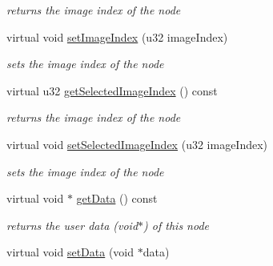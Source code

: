 \begin{DoxyCompactItemize}
\begin{DoxyCompactList}\small\item\em returns the image index of the node \end{DoxyCompactList}\item 
\hypertarget{classirr_1_1gui_1_1_c_g_u_i_tree_view_node_a49531c286b4ceaad4792c99edaccede4}{virtual void \hyperlink{classirr_1_1gui_1_1_c_g_u_i_tree_view_node_a49531c286b4ceaad4792c99edaccede4}{set\-Image\-Index} (u32 image\-Index)}\label{classirr_1_1gui_1_1_c_g_u_i_tree_view_node_a49531c286b4ceaad4792c99edaccede4}

\begin{DoxyCompactList}\small\item\em sets the image index of the node \end{DoxyCompactList}\item 
\hypertarget{classirr_1_1gui_1_1_c_g_u_i_tree_view_node_a476c1318477189a6a87255115302b2b4}{virtual u32 \hyperlink{classirr_1_1gui_1_1_c_g_u_i_tree_view_node_a476c1318477189a6a87255115302b2b4}{get\-Selected\-Image\-Index} () const }\label{classirr_1_1gui_1_1_c_g_u_i_tree_view_node_a476c1318477189a6a87255115302b2b4}

\begin{DoxyCompactList}\small\item\em returns the image index of the node \end{DoxyCompactList}\item 
\hypertarget{classirr_1_1gui_1_1_c_g_u_i_tree_view_node_a8c028c9b89df506131f2fcacc7276435}{virtual void \hyperlink{classirr_1_1gui_1_1_c_g_u_i_tree_view_node_a8c028c9b89df506131f2fcacc7276435}{set\-Selected\-Image\-Index} (u32 image\-Index)}\label{classirr_1_1gui_1_1_c_g_u_i_tree_view_node_a8c028c9b89df506131f2fcacc7276435}

\begin{DoxyCompactList}\small\item\em sets the image index of the node \end{DoxyCompactList}\item 
\hypertarget{classirr_1_1gui_1_1_c_g_u_i_tree_view_node_a598025d2aea60803730c38450de1e5f1}{virtual void $\ast$ \hyperlink{classirr_1_1gui_1_1_c_g_u_i_tree_view_node_a598025d2aea60803730c38450de1e5f1}{get\-Data} () const }\label{classirr_1_1gui_1_1_c_g_u_i_tree_view_node_a598025d2aea60803730c38450de1e5f1}

\begin{DoxyCompactList}\small\item\em returns the user data (void$\ast$) of this node \end{DoxyCompactList}\item 
\hypertarget{classirr_1_1gui_1_1_c_g_u_i_tree_view_node_a3bdc8a1f872c53cde7a76fc092bcb886}{virtual void \hyperlink{classirr_1_1gui_1_1_c_g_u_i_tree_view_node_a3bdc8a1f872c53cde7a76fc092bcb886}{set\-Data} (void $\ast$data)}\label{classirr_1_1gui_1_1_c_g_u_i_tree_view_node_a3bdc8a1f872c53cde7a76fc092bcb886}


\end{DoxyCompactItemize}
